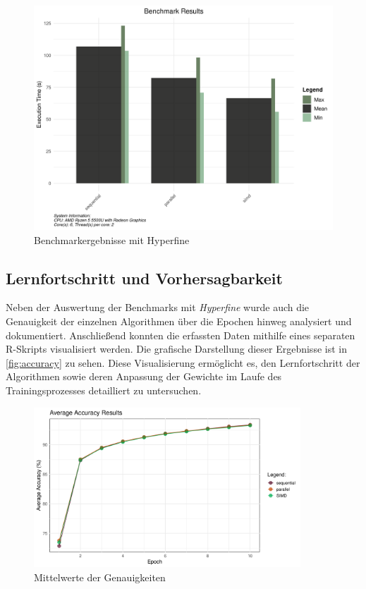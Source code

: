 \documentclass[a4paper, 12pt]{article}
\begin{document}
\begin{figure}[h]
	\begin{center}
		\includegraphics[width=12.5cm]{Bilders/benchmark_plot.png}
		\caption{Benchmarkergebnisse mit Hyperfine}
		\label{fig:plot}
	\end{center}
\end{figure}

\subsection{Lernfortschritt und Vorhersagbarkeit}\label{chapter..4.3}

Neben der Auswertung der Benchmarks mit \textit{Hyperfine} wurde auch die Genauigkeit der 
einzelnen Algorithmen über die Epochen hinweg analysiert und dokumentiert. Anschließend konnten 
die erfassten Daten mithilfe eines separaten R-Skripts visualisiert werden. Die grafische 
Darstellung dieser Ergebnisse ist in \autoref{fig:accuracy} zu sehen. Diese Visualisierung 
ermöglicht es, den Lernfortschritt der Algorithmen sowie deren Anpassung der Gewichte im Laufe des 
Trainingsprozesses detailliert zu untersuchen.

\begin{figure}[H]
    \begin{center}
        \includegraphics[width=10cm]{Bilders/accuracy_plot.png}
        \caption{Mittelwerte der Genauigkeiten}
        \label{fig:accuracy}
    \end{center}
\end{figure}
\end{document}
